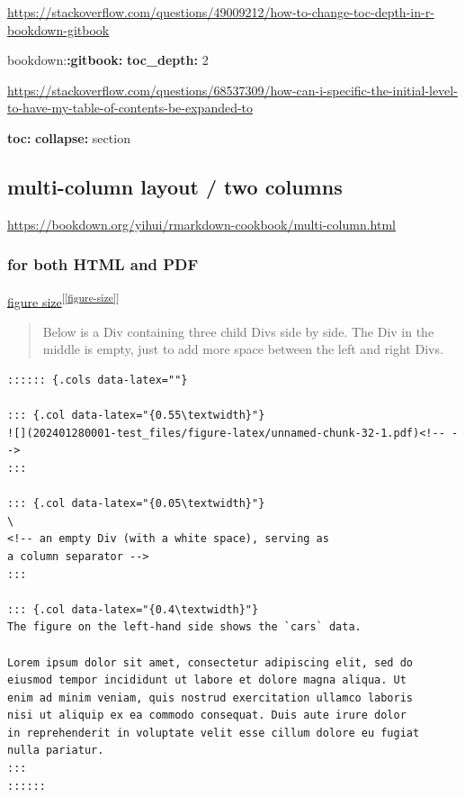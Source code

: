 \documentclass[
]{book}
\newenvironment{Shaded}{\begin{snugshade}}{\end{snugshade}}
\newcommand{\AttributeTok}[1]{\textcolor[rgb]{0.13,0.29,0.53}{#1}}
\newcommand{\DecValTok}[1]{\textcolor[rgb]{0.00,0.00,0.81}{#1}}
\newcommand{\FunctionTok}[1]{\textcolor[rgb]{0.13,0.29,0.53}{\textbf{#1}}}
\newcommand{\KeywordTok}[1]{\textcolor[rgb]{0.13,0.29,0.53}{\textbf{#1}}}
\theoremstyle{definition}
\theoremstyle{definition}
\theoremstyle{definition}
\theoremstyle{definition}
\theoremstyle{remark}
\begin{document}
\url{https://stackoverflow.com/questions/49009212/how-to-change-toc-depth-in-r-bookdown-gitbook}

\begin{Shaded}
\begin{Highlighting}[]
\AttributeTok{bookdown:}\FunctionTok{:gitbook}\KeywordTok{:}
\AttributeTok{    }\FunctionTok{toc\_depth}\KeywordTok{:}\AttributeTok{ }\DecValTok{2}
\end{Highlighting}
\end{Shaded}

\url{https://stackoverflow.com/questions/68537309/how-can-i-specific-the-initial-level-to-have-my-table-of-contents-be-expanded-to}

\begin{Shaded}
\begin{Highlighting}[]
\FunctionTok{toc}\KeywordTok{:}
\AttributeTok{  }\FunctionTok{collapse}\KeywordTok{:}\AttributeTok{ section}
\end{Highlighting}
\end{Shaded}

\subsection{multi-column layout / two columns}\label{multi-column}

\url{https://bookdown.org/yihui/rmarkdown-cookbook/multi-column.html}

\subsubsection{for both HTML and PDF}\label{for-both-html-and-pdf}

\hyperref[figure-size]{figure size}\textsuperscript{{[}\ref{figure-size}{]}}

\begin{quote}
Below is a Div containing three child Divs side by side. The Div in the middle is empty, just to add more space between the left and right Divs.
\end{quote}

\begin{verbatim}
:::::: {.cols data-latex=""}

::: {.col data-latex="{0.55\textwidth}"}
![](202401280001-test_files/figure-latex/unnamed-chunk-32-1.pdf)<!-- --> 
:::

::: {.col data-latex="{0.05\textwidth}"}
\ 
<!-- an empty Div (with a white space), serving as
a column separator -->
:::

::: {.col data-latex="{0.4\textwidth}"}
The figure on the left-hand side shows the `cars` data.

Lorem ipsum dolor sit amet, consectetur adipiscing elit, sed do
eiusmod tempor incididunt ut labore et dolore magna aliqua. Ut
enim ad minim veniam, quis nostrud exercitation ullamco laboris
nisi ut aliquip ex ea commodo consequat. Duis aute irure dolor
in reprehenderit in voluptate velit esse cillum dolore eu fugiat
nulla pariatur.
:::
::::::
\end{verbatim}
\end{document}
